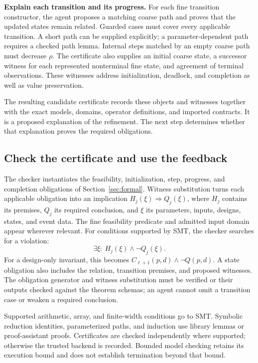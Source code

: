 \documentclass[11pt]{article}
\begin{document}
\textbf{Explain each transition and its progress.} For each fine transition constructor, the agent proposes a matching coarse path and proves that the updated states remain related. Guarded cases must cover every applicable transition. A short path can be supplied explicitly; a parameter-dependent path requires a checked path lemma. Internal steps matched by an empty coarse path must decrease $\rho$. The certificate also supplies an initial coarse state, a successor witness for each represented nonterminal fine state, and agreement of terminal observations. These witnesses address initialization, deadlock, and completion as well as value preservation.

The resulting candidate certificate records these objects and witnesses together with the exact models, domains, operator definitions, and imported contracts. It is a proposed explanation of the refinement. The next step determines whether that explanation proves the required obligations.

\subsection{Check the certificate and use the feedback}\label{sec:certificate-checking}
The checker instantiates the feasibility, initialization, step, progress, and completion obligations of Section~\ref{sec:formal}. Witness substitution turns each applicable obligation into an implication $H_j(\xi)\Rightarrow Q_j(\xi)$, where $H_j$ contains its premises, $Q_j$ its required conclusion, and $\xi$ its parameters, inputs, designs, states, and event data. The fine feasibility predicate and admitted input domain appear wherever relevant. For conditions supported by SMT, the checker searches for a violation:
\begin{equation}
 \exists\xi:\ H_j(\xi)\land\neg Q_j(\xi).
 \label{eq:verification-query}
\end{equation}
For a design-only invariant, this becomes $C_{\ell+1}(p,d)\land\neg Q(p,d)$. A state obligation also includes the relation, transition premises, and proposed witnesses. The obligation generator and witness substitution must be verified or their outputs checked against the theorem schemas; an agent cannot omit a transition case or weaken a required conclusion.

Supported arithmetic, array, and finite-width conditions go to SMT. Symbolic reduction identities, parameterized paths, and induction use library lemmas or proof-assistant proofs. Certificates are checked independently where supported; otherwise the trusted backend is recorded. Bounded model checking retains its execution bound and does not establish termination beyond that bound.
\end{document}
